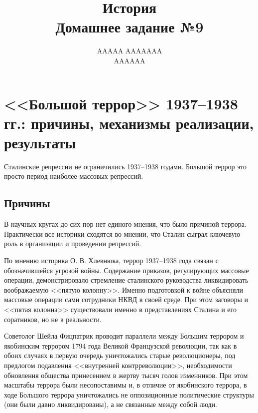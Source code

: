 \documentclass[12pt]{article}
\title{История \\ Домашнее задание №9}
\author{AAAAA AAAAAAA \\ AAAAAA}
\newcommand{\teal}[1]{{\color{teal}{#1}}}
\begin{document}
  \maketitle

  \setcounter{section}{3}
  \section{<<Большой террор>> 1937--1938 гг.: причины, механизмы реализации, результаты}
  Сталинские репрессии не ограничились 1937--1938 годами.
  Большой террор это просто период наиболее массовых репрессий.
  \subsection{Причины}
  В научных кругах до сих пор нет единого мнения, что было причиной террора.
  Практически все историки сходятся во мнении, что Сталин сыграл ключевую роль в организации и проведении репрессий.

  По мнению историка О. В. Хлевнюка, террор 1937--1938 года связан с обозначившейся угрозой войны.
  Содержание приказов, регулирующих массовые операции, демонстрировало стремление сталинского руководства ликвидировать воображаемую <<пятую колонну>>.
  Именно подготовкой к войне объясняли массовые операции сами сотрудники НКВД \teal{(ранняя версия КГБ)} в своей среде.
  При этом заговоры и <<пятая колонна>> существовали именно в представлениях Сталина и его соратников, но не в реальности.

  Советолог Шейла Фицпатрик проводит параллели между Большим террором и якобинским террором 1794 года Великой Французской революции, так как в обоих случаях в первую очередь уничтожались старые революционеры, под предлогом подавления <<внутренней контрреволюции>>, необходимости обновления общества принесением в жертву тысяч голов изменников.
  При этом масштабы террора были несопоставимы и, в отличие от якобинского террора, в ходе Большого террора уничтожались не оппозиционные политические структуры (они были давно ликвидированы), а не связанные между собой люди.
\end{document}
